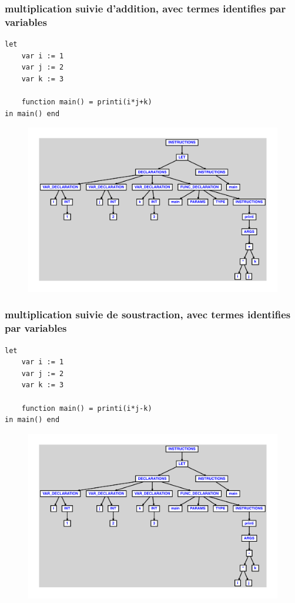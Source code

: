 \documentclass{article}
\begin{document}
\subsubsection{multiplication suivie d'addition, avec termes identifies par variables}
\begin{lstlisting}
let
	var i := 1
	var j := 2
	var k := 3

	function main() = printi(i*j+k)
in main() end
\end{lstlisting}
\newpage
\begin{figure}[H]
\centering
\includegraphics[max width=\textwidth]{ast/ast_59.pdf}
\end{figure}
\newpage
\subsubsection{multiplication suivie de soustraction, avec termes identifies par variables}
\begin{lstlisting}
let
	var i := 1
	var j := 2
	var k := 3

	function main() = printi(i*j-k)
in main() end
\end{lstlisting}
\newpage
\begin{figure}[H]
\centering
\includegraphics[max width=\textwidth]{ast/ast_60.pdf}
\end{figure}
\newpage
\end{document}

